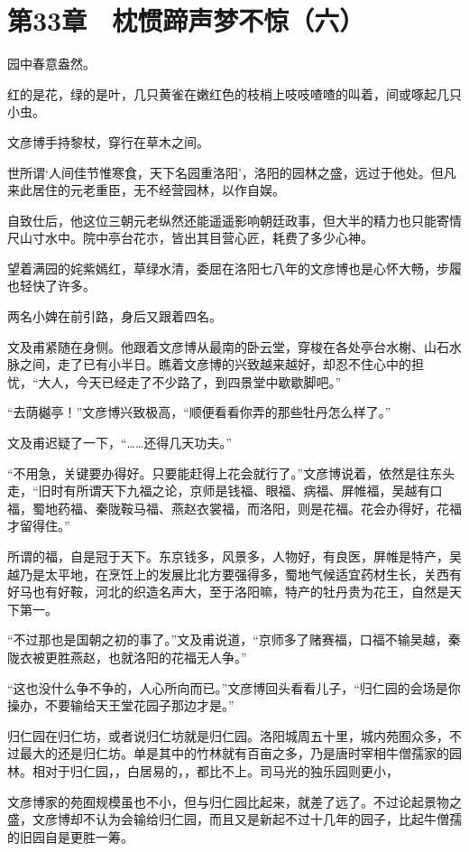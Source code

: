 \section{第33章　枕惯蹄声梦不惊（六）}

园中春意盎然。

红的是花，绿的是叶，几只黄雀在嫩红色的枝梢上吱吱喳喳的叫着，间或啄起几只小虫。

文彦博手持黎杖，穿行在草木之间。

世所谓‘人间佳节惟寒食，天下名园重洛阳’，洛阳的园林之盛，远过于他处。但凡来此居住的元老重臣，无不经营园林，以作自娱。

自致仕后，他这位三朝元老纵然还能遥遥影响朝廷政事，但大半的精力也只能寄情尺山寸水中。院中亭台花朩，皆出其目营心匠，耗费了多少心神。

望着满园的姹紫嫣红，草绿水清，委屈在洛阳七八年的文彦博也是心怀大畅，步履也轻快了许多。

两名小婢在前引路，身后又跟着四名。

文及甫紧随在身侧。他跟着文彦博从最南的卧云堂，穿梭在各处亭台水榭、山石水脉之间，走了已有小半日。瞧着文彦博的兴致越来越好，却忍不住心中的担忧，“大人，今天已经走了不少路了，到四景堂中歇歇脚吧。”

“去荫樾亭！”文彦博兴致极高，“顺便看看你弄的那些牡丹怎么样了。”

文及甫迟疑了一下，“……还得几天功夫。”

“不用急，关键要办得好。只要能赶得上花会就行了。”文彦博说着，依然是往东头走，“旧时有所谓天下九福之论，京师是钱福、眼福、病福、屏帷福，吴越有口福，蜀地药福、秦陇鞍马福、燕赵衣裳福，而洛阳，则是花福。花会办得好，花福才留得住。”

所谓的福，自是冠于天下。东京钱多，风景多，人物好，有良医，屏帷是特产，吴越乃是太平地，在烹饪上的发展比北方要强得多，蜀地气候适宜药材生长，关西有好马也有好鞍，河北的织造名声大，至于洛阳嘛，特产的牡丹贵为花王，自然是天下第一。

“不过那也是国朝之初的事了。”文及甫说道，“京师多了赌赛福，口福不输吴越，秦陇衣被更胜燕赵，也就洛阳的花福无人争。”

“这也没什么争不争的，人心所向而已。”文彦博回头看看儿子，“归仁园的会场是你操办，不要输给天王堂花园子那边才是。”

归仁园在归仁坊，或者说归仁坊就是归仁园。洛阳城周五十里，城内苑囿众多，不过最大的还是归仁坊。单是其中的竹林就有百亩之多，乃是唐时宰相牛僧孺家的园林。相对于归仁园，，白居易的，，都比不上。司马光的独乐园则更小，

文彦博家的苑囿规模虽也不小，但与归仁园比起来，就差了远了。不过论起景物之盛，文彦博却不认为会输给归仁园，而且又是新起不过十几年的园子，比起牛僧孺的旧园自是更胜一筹。


